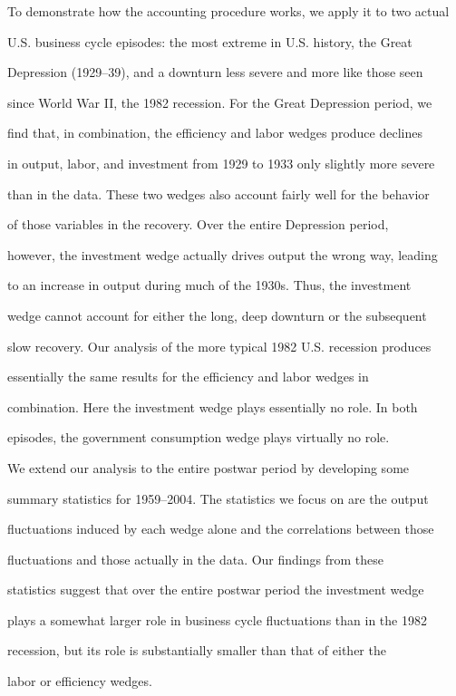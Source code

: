 \documentclass[fleqn,leqno,11pt]{article}
\begin{document}
To demonstrate how the accounting procedure works, we apply it to two actual

U.S. business cycle episodes: the most extreme in U.S. history, the Great

Depression (1929--39), and a downturn less severe and more like those seen

since World War II, the 1982 recession. For the Great Depression period, we

find that, in combination, the efficiency and labor wedges produce declines

in output, labor, and investment from 1929 to 1933 only slightly more severe

than in the data. These two wedges also account fairly well for the behavior

of those variables in the recovery. Over the entire Depression period,

however, the investment wedge actually drives output the wrong way, leading

to an increase in output during much of the 1930s. Thus, the investment

wedge cannot account for either the long, deep downturn or the subsequent

slow recovery. Our analysis of the more typical 1982 U.S. recession produces

essentially the same results for the efficiency and labor wedges in

combination. Here the investment wedge plays essentially no role. In both

episodes, the government consumption wedge plays virtually no role.



We extend our analysis to the entire postwar period by developing some

summary statistics for 1959--2004. The statistics we focus on are the output

fluctuations induced by each wedge alone and the correlations between those

fluctuations and those actually in the data. Our findings from these

statistics suggest that over the entire postwar period the investment wedge

plays a somewhat larger role in business cycle fluctuations than in the 1982

recession, but its role is substantially smaller than that of either the

labor or efficiency wedges.
\end{document}
